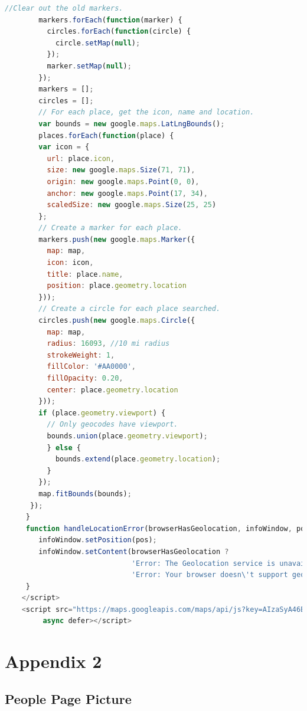\documentclass[draftclsnofoot,10pt,onecolumn]{IEEEtran} %
\begin{document}
\begin{center}
\begin{lstlisting}[caption=eventSearch.html showing JavaScript that creates
  the map for the events search, language=JavaScript]
        //Clear out the old markers.
        markers.forEach(function(marker) {
          circles.forEach(function(circle) {
            circle.setMap(null);
          });
          marker.setMap(null);
        });
        markers = [];
        circles = [];
        // For each place, get the icon, name and location.
        var bounds = new google.maps.LatLngBounds();
        places.forEach(function(place) {
        var icon = {
          url: place.icon,
          size: new google.maps.Size(71, 71),
          origin: new google.maps.Point(0, 0),
          anchor: new google.maps.Point(17, 34),
          scaledSize: new google.maps.Size(25, 25)
        };
        // Create a marker for each place.
        markers.push(new google.maps.Marker({
          map: map,
          icon: icon,
          title: place.name,
          position: place.geometry.location
        }));
        // Create a circle for each place searched.
        circles.push(new google.maps.Circle({
          map: map,
          radius: 16093, //10 mi radius
          strokeWeight: 1,
          fillColor: '#AA0000',
          fillOpacity: 0.20,
          center: place.geometry.location
        }));
        if (place.geometry.viewport) {
          // Only geocodes have viewport.
          bounds.union(place.geometry.viewport);
          } else {
            bounds.extend(place.geometry.location);
          }
        });
        map.fitBounds(bounds);
      });
     }
     function handleLocationError(browserHasGeolocation, infoWindow, pos) {
        infoWindow.setPosition(pos);
        infoWindow.setContent(browserHasGeolocation ?
                              'Error: The Geolocation service is unavailable.' :
                              'Error: Your browser doesn\'t support geolocation.');
     }
    </script>
    <script src="https://maps.googleapis.com/maps/api/js?key=AIzaSyA46B8dAoEQyc1tdHK89306TdQD_Ox6iw0&libraries=places&sensor=true&callback=initMap"
         async defer></script> 
  \end{lstlisting}
\end{center}
    
\section{Appendix 2}

\subsection{People Page Picture}
\end{document}
